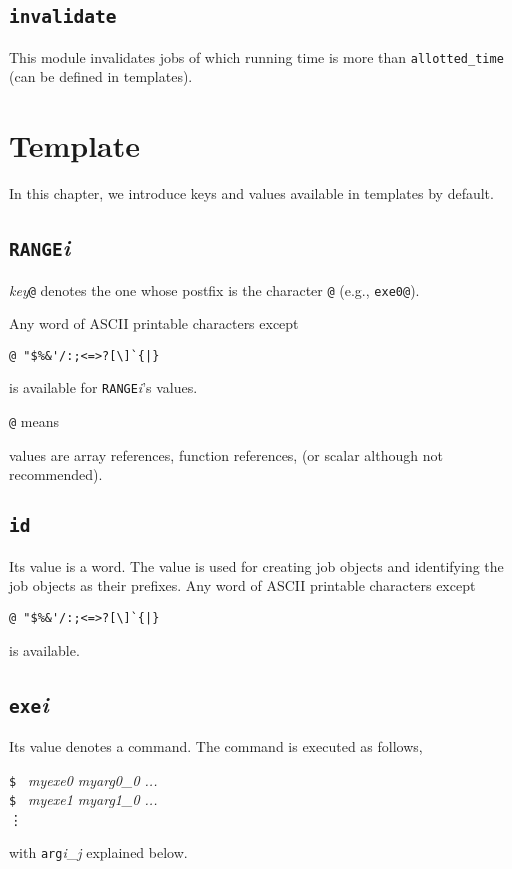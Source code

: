 \documentclass[a4paper,10pt]{report}
\begin{document}
\fi

\section{\texttt{invalidate}}

This module invalidates jobs of which running time is more than
\texttt{allotted\_time} (can be defined in templates).

\chapter{Template}\label{chapjobdefhash}

In this chapter, we introduce keys and values available in templates
by default.

\section{\texttt{RANGE}\textit{i}}

\textit{key}\texttt{@} denotes the one whose postfix is the
character \texttt{@} (e.g., \texttt{exe0@}).


Any word of ASCII printable characters except
\begin{center}
\verb*+@ "$%&'/:;<=>?[\]`{|}+        %
\end{center}
is available for \texttt{RANGE}\textit{i}'s values.

\texttt{@} means

values are array references, function references, (or scalar although
not recommended).

\section{\texttt{id}}

Its value is a word.  The value is used for creating job objects and
identifying the job objects as their prefixes.  Any word of ASCII
printable characters except
\begin{center}
\verb*+@ "$%&'/:;<=>?[\]`{|}+        %
\end{center}
is available.

\section{\texttt{exe}\textit{i}}

Its value denotes a command.  The command is executed as follows,
\begin{screen}
\texttt{\$ } \textit{myexe0 myarg0\_0 ...}\\
\texttt{\$ } \textit{myexe1 myarg1\_0 ...}\\
\vdots
\end{screen}
with \texttt{arg}\textit{i}\_\textit{j} explained below.
\end{document}
